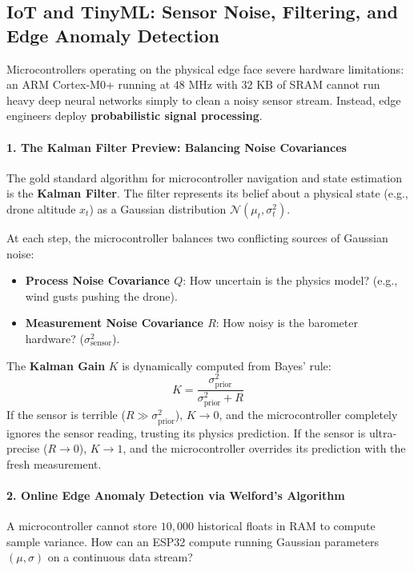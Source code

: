 \subsection{IoT and TinyML: Sensor Noise, Filtering, and Edge Anomaly Detection}\label{subsec:prob_iot}

\begin{iotbox}
Microcontrollers operating on the physical edge face severe hardware limitations: an ARM Cortex-M0+ running at $48\text{ MHz}$ with $32\text{ KB}$ of SRAM cannot run heavy deep neural networks simply to clean a noisy sensor stream. Instead, edge engineers deploy \textbf{probabilistic signal processing}.

\paragraph{1. The Kalman Filter Preview: Balancing Noise Covariances}
The gold standard algorithm for microcontroller navigation and state estimation is the \textbf{Kalman Filter}. The filter represents its belief about a physical state (e.g., drone altitude $x_t$) as a Gaussian distribution $\mathcal{N}(\mu_t, \sigma_t^2)$.

At each step, the microcontroller balances two conflicting sources of Gaussian noise:
\begin{itemize}
    \item \textbf{Process Noise Covariance $Q$}: How uncertain is the physics model? (e.g., wind gusts pushing the drone).
    \item \textbf{Measurement Noise Covariance $R$}: How noisy is the barometer hardware? ($\sigma_{\text{sensor}}^2$).
\end{itemize}
The \textbf{Kalman Gain} $K$ is dynamically computed from Bayes' rule:
\begin{equation}
K = \frac{\sigma_{\text{prior}}^2}{\sigma_{\text{prior}}^2 + R}
\end{equation}
If the sensor is terrible ($R \gg \sigma_{\text{prior}}^2$), $K \to 0$, and the microcontroller completely ignores the sensor reading, trusting its physics prediction. If the sensor is ultra-precise ($R \to 0$), $K \to 1$, and the microcontroller overrides its prediction with the fresh measurement.

\paragraph{2. Online Edge Anomaly Detection via Welford's Algorithm}
A microcontroller cannot store $10,000$ historical floats in RAM to compute sample variance. How can an ESP32 compute running Gaussian parameters $(\mu, \sigma)$ on a continuous data stream?


\end{iotbox}
